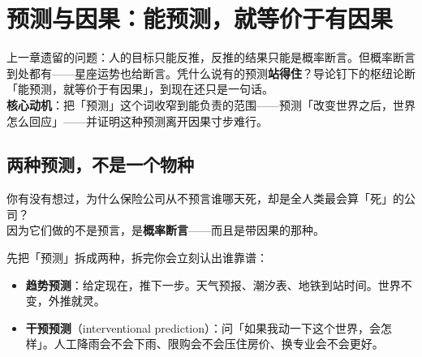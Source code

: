 \documentclass[../../main2.tex]{subfiles}
\begin{document}
\chapter{预测与因果：能预测，就等价于有因果}
\label{ch:prediction}

\begin{motivation}
	上一章遗留的问题：人的目标只能反推，反推的结果只能是概率断言。但概率断言到处都有——星座运势也给断言。凭什么说有的预测\textbf{站得住}？导论钉下的枢纽论断「能预测，就等价于有因果」，到现在还只是一句话。\\
	\textbf{核心动机}：把「预测」这个词收窄到能负责的范围——预测「改变世界之后，世界怎么回应」——并证明这种预测离开因果寸步难行。
\end{motivation}

\begin{logicmap}
\end{logicmap}

\section{两种预测，不是一个物种}
\label{sec:pred-prob}

\begin{readingnote}
	你有没有想过，为什么保险公司从不预言谁哪天死，却是全人类最会算「死」的公司？\\
	因为它们做的不是预言，是\textbf{概率断言}——而且是带因果的那种。
\end{readingnote}

先把「预测」拆成两种，拆完你会立刻认出谁靠谱：

\begin{itemize}
	\item \textbf{趋势预测}：给定现在，推下一步。天气预报、潮汐表、地铁到站时间。世界不变，外推就灵。
	\item \textbf{干预预测}（interventional prediction）：问「如果我动一下这个世界，会怎样」。人工降雨会不会下雨、限购会不会压住房价、换专业会不会更好。
\end{itemize}
\end{document}
